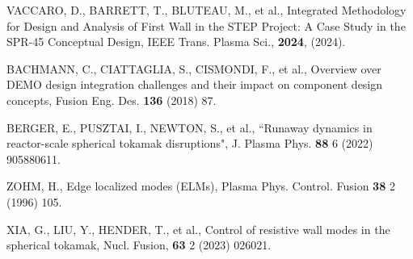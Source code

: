 \documentclass[10pt, a4paper, twoside]{article}
\begin{document}
\begin{thebibliography}{9}
    VACCARO, D., BARRETT, T., BLUTEAU, M., et al.,
    Integrated Methodology for Design and Analysis of First Wall in the STEP Project: A Case Study in the SPR-45 Conceptual Design,
    IEEE Trans. Plasma Sci.,
    \textbf{2024},
    (2024).

    BACHMANN, C., CIATTAGLIA, S., CISMONDI, F., et al., 
    Overview over DEMO design integration challenges and their impact on component design concepts, 
    Fusion Eng. Des. 
    \textbf{136} 
    (2018)
    87.


    BERGER, E., PUSZTAI, I., NEWTON, S., et al.,
    ``Runaway dynamics in reactor-scale spherical tokamak disruptions",
    J. Plasma Phys. 
    \textbf{88} 6 
    (2022)
    905880611.

    ZOHM, H., 
    Edge localized modes (ELMs), 
    Plasma Phys. Control. Fusion 
    \textbf{38} 2 
    (1996) 
    105.

    XIA, G., LIU, Y., HENDER, T., et al.,
    Control of resistive wall modes in the spherical tokamak,
    Nucl. Fusion,
    \textbf{63} 2
    (2023)
    026021.



\end{thebibliography}
\end{document}
